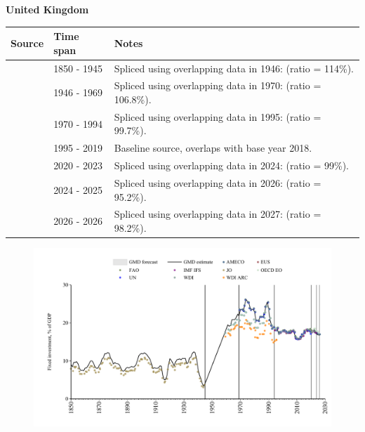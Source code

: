 \documentclass[12pt,a4paper,landscape]{article}
\begin{document}
\begin{adjustbox}{max totalsize={\paperwidth}{\paperheight},center}
\begin{minipage}[t][\textheight][t]{\textwidth}
\vspace*{0.5cm}
{}
\begin{center}
{\Large\bfseries United Kingdom}
\end{center}
\vspace{0.5cm}
\begin{table}[H]
\centering
\small
\begin{tabular}{|l|l|l|}
\hline
\textbf{Source} & \textbf{Time span} & \textbf{Notes} \\
\hline
\rowcolor{white}\cite{JO}& 1850 - 1945 &Spliced using overlapping data in 1946: (ratio = 114\%).\\
\rowcolor{lightgray}\cite{OECD_EO}& 1946 - 1969 &Spliced using overlapping data in 1970: (ratio = 106.8\%).\\
\rowcolor{white}\cite{WDI}& 1970 - 1994 &Spliced using overlapping data in 1995: (ratio = 99.7\%).\\
\rowcolor{lightgray}\cite{EUS}& 1995 - 2019 &Baseline source, overlaps with base year 2018.\\
\rowcolor{white}\cite{WDI}& 2020 - 2023 &Spliced using overlapping data in 2024: (ratio = 99\%).\\
\rowcolor{lightgray}\cite{OECD_EO}& 2024 - 2025 &Spliced using overlapping data in 2026: (ratio = 95.2\%).\\
\rowcolor{white}\cite{AMECO}& 2026 - 2026 &Spliced using overlapping data in 2027: (ratio = 98.2\%).\\
\hline
\end{tabular}
\end{table}
\begin{figure}[H]
\centering
\includegraphics[width=\textwidth,height=0.6\textheight,keepaspectratio]{graphs/GBR_finv_GDP.pdf}
\end{figure}
\end{minipage}
\end{adjustbox}
\end{document}
